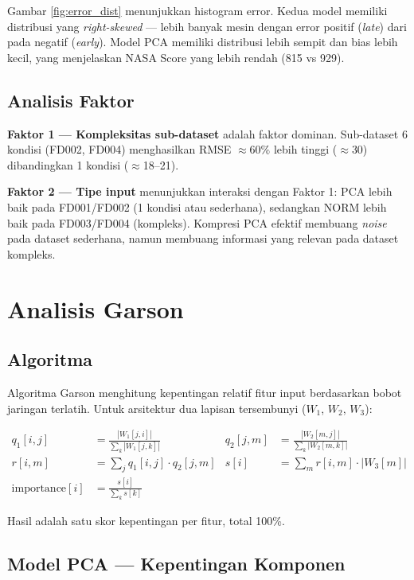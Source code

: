 \documentclass[11pt,a4paper]{article}
\begin{document}
Gambar \ref{fig:error_dist} menunjukkan histogram error. Kedua model
memiliki distribusi yang \textit{right-skewed} --- lebih banyak mesin
dengan error positif (\textit{late}) dari pada negatif (\textit{early}).
Model PCA memiliki distribusi lebih sempit dan bias lebih kecil, yang
menjelaskan NASA Score yang lebih rendah (815 vs 929).

\subsection{Analisis Faktor}

\textbf{Faktor 1 --- Kompleksitas sub-dataset} adalah faktor dominan.
Sub-dataset 6 kondisi (FD002, FD004) menghasilkan RMSE $\approx 60\%$
lebih tinggi ($\approx$30) dibandingkan 1 kondisi ($\approx$18--21).

\textbf{Faktor 2 --- Tipe input} menunjukkan interaksi dengan Faktor 1:
PCA lebih baik pada FD001/FD002 (1 kondisi atau sederhana), sedangkan
NORM lebih baik pada FD003/FD004 (kompleks). Kompresi PCA efektif
membuang \textit{noise} pada dataset sederhana, namun membuang informasi
yang relevan pada dataset kompleks.

\section{Analisis Garson}

\subsection{Algoritma}

Algoritma Garson \cite{garson1991} menghitung kepentingan relatif
fitur input berdasarkan bobot jaringan terlatih. Untuk arsitektur
dua lapisan tersembunyi ($W_1$, $W_2$, $W_3$):

\begin{align}
  q_1[i,j] &= \frac{|W_1[j,i]|}{\sum_k |W_1[j,k]|} &
  q_2[j,m] &= \frac{|W_2[m,j]|}{\sum_k |W_2[m,k]|} \\[4pt]
  r[i,m]   &= \sum_j q_1[i,j] \cdot q_2[j,m] &
  s[i]     &= \sum_m r[i,m] \cdot |W_3[m]| \\[4pt]
  \text{importance}[i] &= \frac{s[i]}{\sum_k s[k]}
\end{align}

Hasil adalah satu skor kepentingan per fitur, total 100\%.

\subsection{Model PCA --- Kepentingan Komponen}
\end{document}
